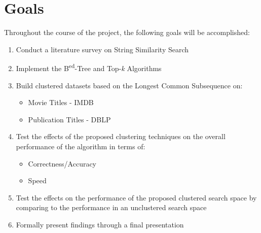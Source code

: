 \documentclass[pdftex,12pt,letter]{article}
\begin{document}
\section{Goals}
Throughout the course of the project, the following goals will be accomplished:
\begin{enumerate}
\item Conduct a literature survey on String Similarity Search
\item Implement the B\textsuperscript{ed}-Tree and Top-\textit{k} Algorithms
\item Build clustered datasets based on the Longest Common Subsequence on:
\begin{itemize}
\item Movie Titles - IMDB
\item Publication Titles - DBLP
\end{itemize}
\item Test the effects of the proposed clustering techniques on the overall performance of the algorithm in terms of:
\begin{itemize}
\item Correctness/Accuracy
\item Speed
\end{itemize}
\item Test the effects on the performance of the proposed clustered search space by comparing to the performance in an unclustered search space
\item Formally present findings through a final presentation
\end{enumerate}
\end{document}

